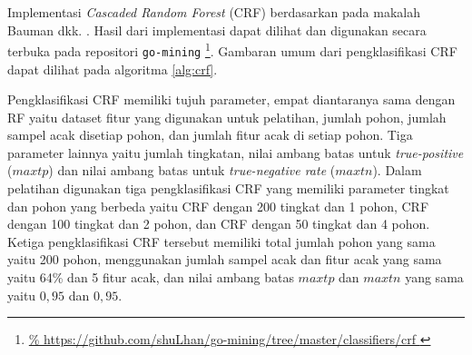 Implementasi \textit{Cascaded Random Forest} (CRF) berdasarkan pada makalah
Bauman dkk.  \cite{baumann2013cascaded}.
Hasil dari implementasi dapat dilihat dan digunakan secara terbuka pada
repositori \texttt{go-mining}
\footnote{
\url{%
https://github.com/shuLhan/go-mining/tree/master/classifiers/crf
}}.
Gambaran umum dari pengklasifikasi CRF dapat dilihat pada algoritma
\ref{alg:crf}.

Pengklasifikasi CRF memiliki tujuh parameter, empat diantaranya sama dengan RF
yaitu dataset fitur yang digunakan untuk pelatihan, jumlah pohon, jumlah sampel
acak disetiap pohon, dan jumlah fitur acak di setiap pohon.
Tiga parameter lainnya yaitu jumlah tingkatan, nilai ambang batas untuk
\textit{true-positive} ($maxtp$) dan nilai ambang batas untuk
\textit{true-negative rate} ($maxtn$).
Dalam pelatihan digunakan tiga pengklasifikasi CRF yang memiliki parameter
tingkat dan pohon yang berbeda yaitu CRF dengan 200 tingkat dan 1 pohon, CRF
dengan 100 tingkat dan 2 pohon, dan CRF dengan 50 tingkat dan 4 pohon.
Ketiga pengklasifikasi CRF tersebut memiliki total jumlah pohon yang sama yaitu
200 pohon, menggunakan jumlah sampel acak dan fitur acak yang sama yaitu 64\%
dan 5 fitur acak, dan nilai ambang batas $maxtp$ dan $maxtn$ yang sama yaitu
$0,95$ dan $0,95$.
